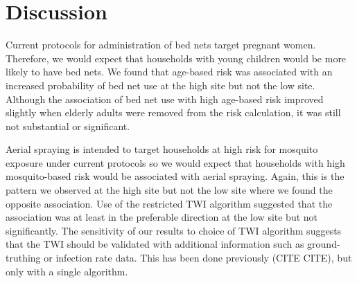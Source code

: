 \documentclass{article}\usepackage[]{graphicx}\usepackage[]{color}
\begin{document}
\section{Discussion}

Current protocols for administration of bed nets target pregnant women.  Therefore,  we would expect that households with young children would be more likely to have bed nets.  We found that age-based risk was associated with an increased probability of bed net use at the high site but not the low site.  Although the association of bed net use with high age-based risk improved slightly when elderly adults were removed from the risk calculation,  it was still not substantial or significant.  

Aerial spraying is intended to target households at high risk for mosquito exposure under current protocols so we would expect that households with high mosquito-based risk would be associated with aerial spraying.  Again,  this is the pattern we observed at the high site but not the low site where we found the opposite association.  Use of the restricted TWI algorithm suggested that the association was at least in the preferable direction at the low site but not significantly.  The sensitivity of our results to choice of TWI algorithm suggests that the TWI should be validated with additional information such as ground-truthing or infection rate data.  This has been done previously (CITE CITE),  but only with a single algorithm.  
\end{document}
